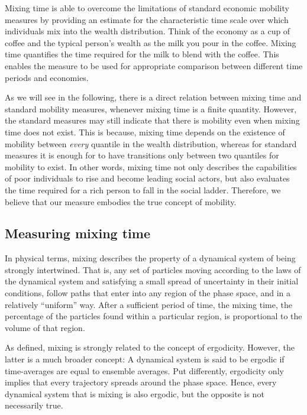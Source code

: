 \documentclass[11pt]{article}
\numberwithin{equation}{section}
\begin{document}
Mixing time is able to overcome the limitations of standard economic mobility measures by providing an estimate for the characteristic time scale over which individuals mix into the wealth distribution. Think of the economy as a cup of coffee and the typical person's wealth as the milk you pour in the coffee. Mixing time quantifies the time required for the milk to blend with the coffee. This enables the measure to be used for appropriate comparison between different time periods and economies.

As we will see in the following, there is a direct relation between mixing time and standard mobility measures, whenever mixing time is a finite quantity. However, the standard measures may still indicate that there is mobility even when mixing time does not exist. This is because,  mixing time depends on the existence of mobility between \textit{every} quantile in the wealth distribution, whereas for standard measures it is enough for to have transitions only between two quantiles for mobility to exist. In other words, mixing time not only describes the capabilities of poor individuals to rise and become leading social actors, but also evaluates the time required for a rich person to fall in the social ladder. Therefore, we believe that our measure embodies the true concept of mobility.

\subsection{Measuring mixing time}

In physical terms, mixing describes the property of a dynamical system of being strongly intertwined. That is, any set of particles moving according to the laws of the dynamical system and satisfying a small spread of uncertainty in their initial conditions, follow paths that enter into any region of the phase space, and in a relatively ``uniform'' way. After a sufficient period of time, the mixing time, the percentage of the particles found within a particular region, is proportional to the volume of that region. 

As defined, mixing is strongly related to the concept of ergodicity. However, the latter is a much broader concept: A dynamical system is said to be ergodic if time-averages are equal to ensemble averages. Put differently, ergodicity only implies that every trajectory spreads around the phase space. Hence, every dynamical system that is mixing is also ergodic, but the opposite is not necessarily true.
\end{document}
